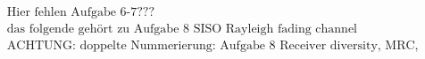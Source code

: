 \documentclass[fleqn]{article}
\begin{document}







\begin{align*}
&\text{Hier fehlen Aufgabe 6-7???}& \\
&\text{das folgende gehört zu Aufgabe 8 SISO Rayleigh fading channel}& \\
&\text{ACHTUNG: doppelte Nummerierung: Aufgabe 8 Receiver diversity, MRC, EGC and SC}&
\end{align*}







\end{document}
